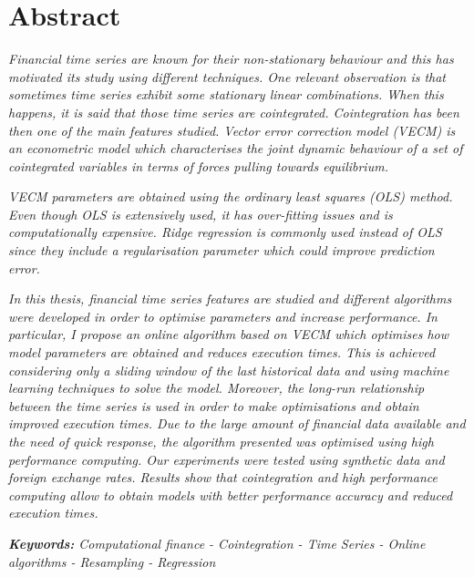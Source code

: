 \chapter*{Abstract}

\emph{Financial time series are known for their non-stationary behaviour and
this has motivated its study using different techniques. 
One relevant observation is that sometimes time series exhibit some stationary
linear combinations. When this happens, it is said that those time series are
cointegrated.  Cointegration has been then one of the main features studied.
Vector error correction model (VECM) is an econometric model which characterises
the joint dynamic behaviour of a set of cointegrated variables in terms of
forces pulling towards equilibrium.}

\emph{VECM parameters are obtained using the ordinary least squares (OLS)
method.  Even though OLS is extensively used, it has over-fitting
issues and is computationally expensive. Ridge regression is commonly used
instead of OLS since they include a regularisation parameter which could improve
prediction error.}

\emph{In this thesis, financial time series features are studied and different
algorithms were developed in order to optimise parameters and increase performance.
In particular, I propose an online algorithm based on VECM which optimises how model parameters are obtained and reduces execution times. This is achieved considering only a sliding window of the last historical data and using machine learning techniques to solve the model. Moreover, the long-run relationship between the time series is used in order to make
optimisations and obtain improved execution times. 
Due to the large amount of financial data available and the need of quick response, 
the algorithm presented
was optimised using high performance computing.
Our experiments were tested using synthetic data and foreign exchange rates.
Results show that cointegration and high performance computing allow to obtain
models with better performance accuracy and reduced execution times.}

\vspace{0.8cm}

\emph{\textbf{Keywords:} Computational finance  - Cointegration  - Time Series - 
Online algorithms - Resampling  - Regression}


